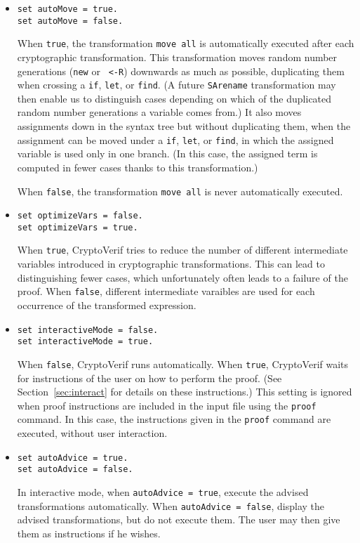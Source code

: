 \begin{itemize}
\begin{itemize}
\item \texttt{set autoMove = true.}\\
\texttt{set autoMove = false.}

When {\tt true}, the transformation {\tt move all} is automatically
executed after each cryptographic transformation. This transformation
moves random number generations ({\tt new} or {\tt
<-R}) downwards as much as possible, duplicating them when crossing
a {\tt if}, {\tt let}, or {\tt find}.  (A future {\tt SArename}
transformation may then enable us to distinguish cases depending on
which of the duplicated random number generations a variable comes
from.)  It also moves assignments down in the syntax tree but without
duplicating them, when the assignment can be moved under a {\tt if},
{\tt let}, or {\tt find}, in which the assigned variable is used
only in one branch. (In this case, the assigned term is computed in
fewer cases thanks to this transformation.)

When {\tt false}, the transformation {\tt move all} is never
automatically executed.

\item \texttt{set optimizeVars = false.}\\
\texttt{set optimizeVars = true.}

When {\tt true}, CryptoVerif tries to reduce the number of different
intermediate variables introduced in cryptographic
transformations. This can lead to distinguishing fewer cases,
which unfortunately often leads to a failure of the proof.
When {\tt false}, different intermediate varaibles are used for
each occurrence of the transformed expression.

\item \texttt{set interactiveMode = false.}\\
\texttt{set interactiveMode = true.}

When {\tt false}, CryptoVerif runs automatically.
When {\tt true}, CryptoVerif waits for instructions of the user
on how to perform the proof. (See Section~\ref{sec:interact}
for details on these instructions.)
%
This setting is ignored when proof instructions are included
in the input file using the \texttt{proof} command.
In this case, the instructions given in the \texttt{proof} command
are executed, without user interaction.

\item \texttt{set autoAdvice = true.}\\
\texttt{set autoAdvice = false.}

In interactive mode, when \texttt{autoAdvice = true}, execute the
advised transformations automatically. When \texttt{autoAdvice = false},
display the advised transformations, but do not execute them.
The user may then give them as instructions if he wishes.


\end{itemize}
\end{itemize}
